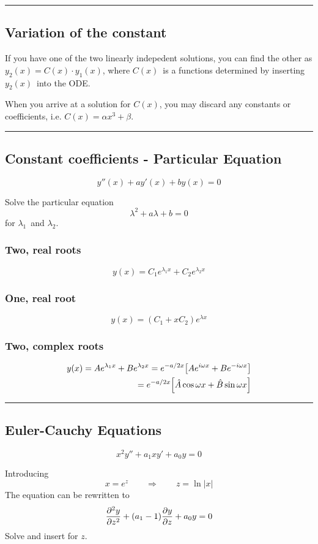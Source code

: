 \documentclass[10pt,a4paper]{article}
\renewcommand{\exp}{e^}
\newcommand{\holine}{\rule{286pt}{1pt}}
\begin{document}
\begin{multicols}{2}
\holine
\subsection*{Variation of the constant}
If you have one of the two linearly indepedent solutions, you can find the other as $y_2(x) = C(x)\cdot y_1(x)$, where $C(x)$ is a functions determined by inserting $y_2(x)$ into the ODE.

When you arrive at a solution for $C(x)$, you may discard any constants or coefficients, i.e. $C(x) = \alpha x^3 + \beta$.


\holine
\subsection*{Constant coefficients - Particular Equation}
\[
    y''(x) + ay'(x) + by(x) = 0
\]

Solve the particular equation
\[
    \lambda^2 + a\lambda + b = 0
\]
for $\lambda_1$ and $\lambda_2$.


\subsubsection*{Two, real roots}
\[
    y(x) = C_1\exp{\lambda_1 x} + C_2\exp{\lambda_2 x}
\]


\subsubsection*{One, real root}
\[
    y(x) = (C_1 + xC_2)\exp{\lambda x}
\]


\subsubsection*{Two, complex roots}
\begin{equation*}
\begin{split}
    y(x) = A\exp{\lambda_1 x} + B\exp{\lambda_2 x} = \exp{-a/2 x}\qty[A\exp{i\omega x} + B\exp{-i\omega x}] \\
    =\exp{-a/2 x}\qty[\hat{A}\cos{\omega x} + \hat{B}\sin{\omega x}]
\end{split}
\end{equation*}


\holine
\subsection*{Euler-Cauchy Equations}
\[
    x^2y'' + a_1x y' + a_0 y = 0
\]

Introducing
\[
    x = \exp{z} \quad\quad\Rightarrow\quad\quad z = \ln|x|
\]
The equation can be rewritten to
\[
    \pdv[2]{y}{z} + (a_1-1)\pdv{y}{z} + a_0 y = 0
\]
Solve and insert for $z$.




\end{multicols}
\end{document}
